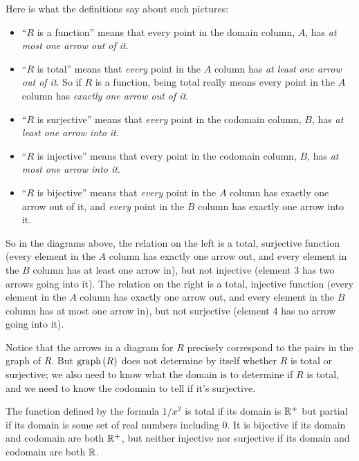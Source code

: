Here is what the definitions say about such pictures:
\begin{itemize}

\item ``$R$ is a function'' means that every point in the domain column,
  $A$, has \emph{at most one arrow out of it}.

\item ``$R$ is total'' means that \emph{every} point in the $A$ column has
  \emph{at least one arrow out of it}.  So if $R$ is a function, being
  total really means every point in the $A$ column has
  \emph{exactly one arrow out of it}.

\item ``$R$ is surjective'' means that \emph{every} point in the codomain
  column, $B$, has \emph{at least one arrow into it}.

\item ``$R$ is injective'' means that every point in the codomain column,
  $B$, has \emph{at most one arrow into it}.

\item ``$R$ is bijective'' means that \emph{every} point in the $A$ column
      has exactly one arrow out of it, and \emph{every} point in the $B$ column
      has exactly one arrow into it.

\end{itemize}

So in the diagrams above, the relation on the left is a total, surjective
function (every element in the $A$ column has exactly one arrow out, and
every element in the $B$ column has at least one arrow in), but not
injective (element 3 has two arrows going into it).  The relation on the
right is a total, injective function (every element in the $A$ column has
exactly one arrow out, and every element in the $B$ column has at most one
arrow in), but not surjective (element 4 has no arrow going into it).


Notice that the arrows in a diagram for $R$ precisely correspond to the
pairs in the graph of $R$.  But $\mathop{\textup{graph}}\nolimits\left(R\right)$ does not determine by itself
whether $R$ is total or surjective; we also need to know what the domain
is to determine if $R$ is total, and we need to know the codomain to tell
if it's surjective.
\begin{example}
  The function defined by the formula $1/x^2$ is total if its domain is
  $\mathbb{R}^+$ but partial if its domain is some set of real numbers
  including 0.  It is bijective if its domain and codomain are both
  $\mathbb{R}^+$, but neither injective nor surjective if its domain and
  codomain are both $\mathbb{R}$.
\end{example}


